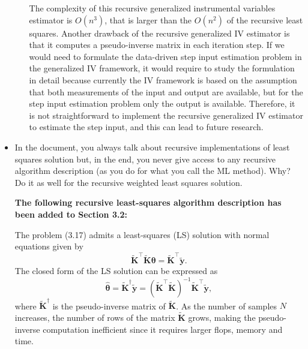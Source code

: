 \documentclass[11pt]{article}
\begin{document}
\begin{itemize}
\begin{itemize}
    The complexity of this recursive generalized instrumental variables estimator is ${O}(n^3)$, that is larger than the ${O}(n^2)$ of the recursive least squares.
    Another drawback of the recursive generalized IV estimator is that it computes a pseudo-inverse matrix in each iteration step.
    If we would need to formulate the data-driven step input estimation problem in the generalized IV framework, it would require to study the formulation in detail because currently the IV framework is based on the assumption that both measurements of the input and output are available, but for the step input estimation problem only the output is available.
    Therefore, it is not straightforward to implement the recursive generalized IV estimator to estimate the step input, and this can lead to future research.
    \color{black}

    \end{itemize}
    \item In the document, you always talk about recursive implementations of least squares solution but, in the end, you never give access to any recursive algorithm description (as you do for what you call the ML method). Why? Do it as well for the recursive weighted least squares solution. 
    
    {\bfseries The following recursive least-squares algorithm description has been added to Section 3.2:}
    
    \color{blue} 
    The problem (3.17) admits a least-squares (LS) solution with normal equations given by
    \begin{equation} \tag{3.19} \widetilde{\mathbf{K}}^\top \widetilde{\mathbf{K}} \bm{\theta} = \widetilde{\mathbf{K}}^\top \widetilde{\mathbf{y}}.   \end{equation} %
    The closed form of the LS solution can be expressed as
    \begin{equation} \tag{3.20} \widehat{\bm{\theta}} = \widetilde{\mathbf{K}}^\dagger \widetilde{\mathbf{y}} = ( \widetilde{\mathbf{K}}^\top \widetilde{\mathbf{K}} )^{-1} \widetilde{\mathbf{K}}^\top \widetilde{\mathbf{y}} , \label{eqn:xhat} \end{equation}
    where $\widetilde{\mathbf{K}}^\dagger$ is the pseudo-inverse matrix of $\widetilde{\mathbf{K}}$.
    As the number of samples $N$ increases, the number of rows of the matrix $\widetilde{\mathbf{K}}$ grows, making the pseudo-inverse computation inefficient since it requires larger flops, memory and time.


\end{itemize}
\end{document}

